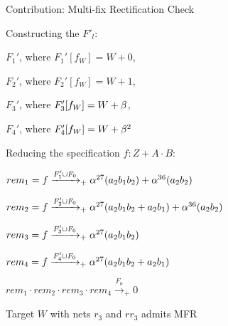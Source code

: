 \begin{frame}{\large Contribution: Multi-fix Rectification Check}
\bi
	\item Constructing the $F'_l$:
	\bi
		\item {$F_1'$, where $F_1'[f_W]=W+0$},
		\item {$F_2'$, where $F_2'[f_W]=W+1$},
		\item {$F_3'$, where $F_3'[f_W]=W+\beta$},
		\item {$F_4'$, where $F_4'[f_W]=W+\beta^2$}
	\ei
	\vspace{0.1in}
	\pause
	\item Reducing the specification $f: Z+A\cdot B$:
\bi
\item $rem_1 = f \xrightarrow[]{F_1'\cup F_{0}}_+{\alpha^{27} (a_2b_1b_2)+\alpha^{36} (a_2b_2)}$
\item $rem_2 = f \xrightarrow[]{F_2'\cup F_{0}}_+{\alpha^{27} (a_2b_1b_2+a_2b_1)+\alpha^{36} (a_2b_2)}$
\item $rem_3 = f \xrightarrow[]{F_3'\cup F_{0}}_+{\alpha^{27} (a_2b_1b_2)}$
\item $rem_4 = f \xrightarrow[]{F_4'\cup F_{0}}_+{\alpha^{27} (a_2b_1b_2+a_2b_1)}$
\ei \pause
	\item $rem_1\cdot rem_2 \cdot rem_3 \cdot rem_4 \xrightarrow{F_0}_+0$
	\item Target $W$ with nets $r_3$ and $rr_3$ admits MFR
\ei
\end{frame}



